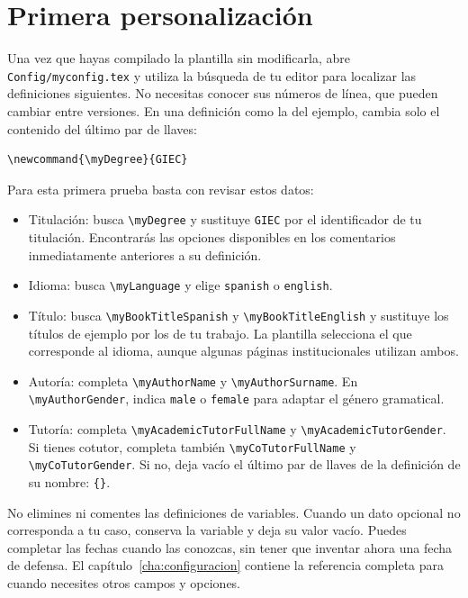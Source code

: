 \section{Primera personalización}
\label{sec:primera-personalizacion}

Una vez que hayas compilado la plantilla sin modificarla, abre \texttt{Config/myconfig.tex} y utiliza la búsqueda de tu editor para localizar las definiciones siguientes. No necesitas conocer sus números de línea, que pueden cambiar entre versiones. En una definición como la del ejemplo, cambia solo el contenido del último par de llaves:

\begin{verbatim}
\newcommand{\myDegree}{GIEC}
\end{verbatim}

Para esta primera prueba basta con revisar estos datos:

\begin{itemize}
  \item Titulación: busca \texttt{\textbackslash{}myDegree} y sustituye \texttt{GIEC} por el identificador de tu titulación. Encontrarás las opciones disponibles en los comentarios inmediatamente anteriores a su definición.
  \item Idioma: busca \texttt{\textbackslash{}myLanguage} y elige \texttt{spanish} o \texttt{english}.
  \item Título: busca \texttt{\textbackslash{}myBookTitleSpanish} y \texttt{\textbackslash{}myBookTitleEnglish} y sustituye los títulos de ejemplo por los de tu trabajo. La plantilla selecciona el que corresponde al idioma, aunque algunas páginas institucionales utilizan ambos.
  \item Autoría: completa \texttt{\textbackslash{}myAuthorName} y \texttt{\textbackslash{}myAuthorSurname}. En \texttt{\textbackslash{}myAuthorGender}, indica \texttt{male} o \texttt{female} para adaptar el género gramatical.
  \item Tutoría: completa \texttt{\textbackslash{}myAcademicTutorFullName} y \texttt{\textbackslash{}myAcademicTutorGender}. Si tienes cotutor, completa también \texttt{\textbackslash{}myCoTutorFullName} y \texttt{\textbackslash{}myCoTutorGender}. Si no, deja vacío el último par de llaves de la definición de su nombre: \texttt{\{\}}.
\end{itemize}

No elimines ni comentes las definiciones de variables. Cuando un dato opcional no corresponda a tu caso, conserva la variable y deja su valor vacío. Puedes completar las fechas cuando las conozcas, sin tener que inventar ahora una fecha de defensa. El capítulo~\ref{cha:configuracion} contiene la referencia completa para cuando necesites otros campos y opciones.

